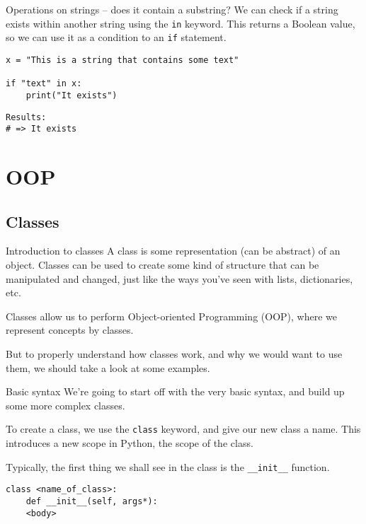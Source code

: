 \documentclass[10pt]{beamer}
\begin{document}
\begin{frame}[label={sec:org8abc3c6},fragile]{Operations on strings -- does it contain a substring?}
 We can check if a string exists within another string using the \texttt{in} keyword. This
returns a Boolean value, so we can use it as a condition to an \texttt{if} statement.

\begin{verbatim}
x = "This is a string that contains some text"

if "text" in x:
    print("It exists")
\end{verbatim}

\begin{verbatim}
Results: 
# => It exists
\end{verbatim}
\end{frame}

\section{OOP}
\label{sec:org8b37cdc}
\subsection{Classes}
\label{sec:orgd3faa2b}

\begin{frame}[label={sec:org2bd2349}]{Introduction to classes}
A class is some representation (can be abstract) of an object. Classes can be used to
create some kind of structure that can be manipulated and changed, just like the ways
you've seen with lists, dictionaries, etc.

Classes allow us to perform Object-oriented Programming (OOP), where we represent
concepts by classes.

But to properly understand how classes work, and why we would want to use them, we
should take a look at some examples.
\end{frame}

\begin{frame}[label={sec:org5b77321},fragile]{Basic syntax}
 We're going to start off with the very basic syntax, and build up some more complex
classes.

To create a class, we use the \texttt{class} keyword, and give our new class a name. This
introduces a new scope in Python, the scope of the class.

Typically, the first thing we shall see in the class is the \texttt{\_\_init\_\_} function.

\begin{verbatim}
class <name_of_class>:
    def __init__(self, args*):
	<body>
\end{verbatim}
\end{frame}
\end{document}
